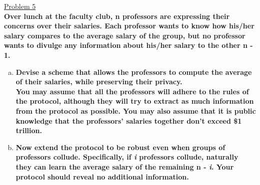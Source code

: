\documentclass[12pt]{article}
\begin{document}
\bigskip
\newpage
\noindent
\uline{Problem 5}
\\\textbf{Over lunch at the faculty club, n professors are expressing their concerns over their salaries. Each
professor wants to know how his/her salary compares to the average salary of the group, but no
professor wants to divulge any information about his/her salary to the other n - 1.}
\begin{enumerate}[(a)]
\item \textbf{Devise a scheme that allows the professors to compute the average of their salaries, while
preserving their privacy.
\\You may assume that all the professors will adhere to the rules of the protocol, although they
will try to extract as much information from the protocol as possible. You may also assume
that it is public knowledge that the professors' salaries together don't exceed \$1 trillion.}
\item \textbf{Now extend the protocol to be robust even when groups of professors collude. Specifically, if \textit{i} professors collude, naturally they can learn the average salary of the remaining n - \textit{i}. Your protocol should reveal no additional information.}
\end{enumerate}
\medskip
\end{document}

